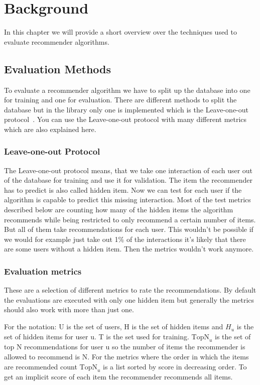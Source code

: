 
\chapter{Background}
\label{background}
In this chapter we will provide a short overview over the techniques
used to evaluate recommender algorithms.


\section{Evaluation Methods}

To evaluate a recommender algorithm we have to split up the database
into one for training and one for evaluation. There are different
methods to split the database but in the library only one is implemented
which is the Leave-one-out protocol~\cite{leaveoneout}.
You can use the Leave-one-out protocol with many different metrics
which are also explained here.


\subsection{Leave-one-out Protocol}
\label{leaveoneout}

The Leave-one-out protocol means, that we take one interaction of
each user out of the database for training and use it for validation.
The item the recommender has to predict is also called hidden item. 
Now we can test for each user if the algorithm is capable to predict
this missing interaction. Most of the test metrics described below are counting
how many of the hidden items the algorithm recommends while being
restricted to only recommend a certain number of items. But all
of them take recommendations for each user. This wouldn't be possible
if we would for example just take out 1\% of the interactions it's
likely that there are some users without a hidden item. Then the metrics
wouldn't work anymore.



\subsection{Evaluation metrics}
\label{evaluationmetrics}

These are a selection of different metrics to rate the recommendations.
By default the evaluations are executed with only one hidden item
but generally the metrics should also work with more than just one.

For the notation: U is the set of users, H is the set of hidden items
and \(H_u\) is the set of hidden items for user u. T is the set used for 
training. \(\text{TopN}_u\)
is the set of top N recommendations for user u so the number of items
the recommender is allowed to recommend is N. For the metrics where
the order in which the items are recommended count \(\text{TopN}_u\)
is a list sorted by score in decreasing order.
To get an implicit score of each item the recommender recommends all
items.


